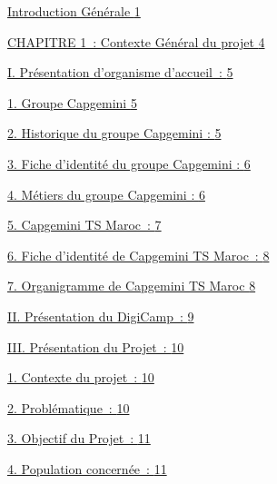 \documentclass[12pt,a4paper,twoside]{report}
\begin{document}
\protect\hyperlink{introduction-guxe9nuxe9rale}{Introduction Générale
\protect\hyperlink{introduction-guxe9nuxe9rale}{1}}

\protect\hyperlink{section}{CHAPITRE 1~: Contexte Général du projet
\protect\hyperlink{section}{4}}

\protect\hyperlink{pruxe9sentation-dorganisme-daccueil}{I. Présentation
d'organisme d'accueil~:
\protect\hyperlink{pruxe9sentation-dorganisme-daccueil}{5}}

\protect\hyperlink{groupe-capgemini}{1. Groupe Capgemini
\protect\hyperlink{groupe-capgemini}{5}}

\protect\hyperlink{historique-du-groupe-capgemini}{2. Historique du groupe Capgemini :
\protect\hyperlink{historique-du-groupe-capgemini}{5}}

\protect\hyperlink{fiche-didentituxe9-du-groupe-capgemini}{3. Fiche
d'identité du groupe Capgemini :
\protect\hyperlink{fiche-didentituxe9-du-groupe-capgemini}{6}}

\protect\hyperlink{muxe9tiers-du-groupe-capgemini}{4. Métiers du groupe
Capgemini : \protect\hyperlink{muxe9tiers-du-groupe-capgemini}{6}}

\protect\hyperlink{capgemini-ts-maroc}{5. Capgemini TS Maroc~:
\protect\hyperlink{capgemini-ts-maroc}{7}}

\protect\hyperlink{fiche-didentituxe9-de-capgemini-ts-maroc}{6. Fiche
d'identité de Capgemini TS Maroc~:
\protect\hyperlink{fiche-didentituxe9-de-capgemini-ts-maroc}{8}}

\protect\hyperlink{organigramme-de-capgemini-ts-maroc}{7. Organigramme
de Capgemini TS Maroc
\protect\hyperlink{organigramme-de-capgemini-ts-maroc}{8}}

\protect\hyperlink{pruxe9sentation-du-digicamp}{II. Présentation du
DigiCamp~: \protect\hyperlink{pruxe9sentation-du-digicamp}{9}}

\protect\hyperlink{pruxe9sentation-du-projet}{III. Présentation du
Projet~: \protect\hyperlink{pruxe9sentation-du-projet}{10}}

\protect\hyperlink{contexte-du-projet}{1. Contexte du projet~:
\protect\hyperlink{contexte-du-projet}{10}}

\protect\hyperlink{probluxe9matique}{2. Problématique~:
\protect\hyperlink{probluxe9matique}{10}}

\protect\hyperlink{objectif-du-projet}{3. Objectif du Projet~:
\protect\hyperlink{objectif-du-projet}{11}}

\protect\hyperlink{population-concernuxe9e}{4. Population concernée~:
\protect\hyperlink{population-concernuxe9e}{11}}
\end{document}
